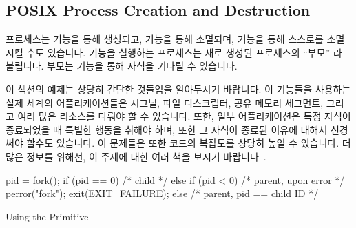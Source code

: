 \fi

\subsection{POSIX Process Creation and Destruction}
\label{sec:toolsoftrade:POSIX Process Creation and Destruction}

프로세스는  기능을 통해 생성되고,  기능을 통해
소멸되며,  기능을 통해 스스로를 소멸시킬 수도 있습니다.
 기능을 실행하는 프로세스는 새로 생성된 프로세스의 ``부모'' 라
불립니다.
부모는  기능을 통해 자식을 기다릴 수 있습니다.

이 섹션의 예제는 상당히 간단한 것들임을 알아두시기 바랍니다.
이 기능들을 사용하는 실제 세계의 어플리케이션들은 시그널, 파일 디스크립터, 공유
메모리 세그먼트, 그리고 여러 많은 리소스를 다뤄야 할 수 있습니다.
또한, 일부 어플리케이션은 특정 자식이 종료되었을 때 특별한 행동을 취해야 하며,
또한 그 자식이 종료된 이유에 대해서 신경써야 할수도 있습니다.
이 문제들은 또한 코드의 복잡도를 상당히 높일 수 있습니다.
더 많은 정보를 위해선, 이 주제에 대한 여러 책을 보시기
바랍니다~\cite{WRichardStevens1992,StewartWeiss2013UNIX}.

\begin{listing}[tbp]
\begin{fcvlabel}
\begin{VerbatimL}[commandchars=\%\[\]]
pid = fork();%
if (pid == 0) {%
	/* child */%
} else if (pid < 0) {%
	/* parent, upon error */%
	perror("fork");
	exit(EXIT_FAILURE);%
} else {
	/* parent, pid == child ID */%
}
\end{VerbatimL}
\end{fcvlabel}
\caption{Using the  Primitive}
\label{lst:toolsoftrade:Using the fork() Primitive}
\end{listing}

